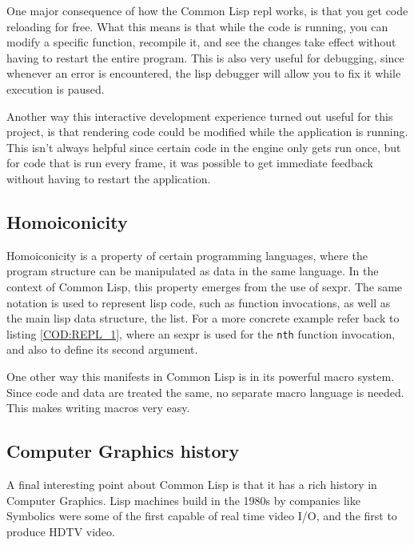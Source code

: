 One major consequence of how the Common Lisp \ac{repl} works,
is that you get code reloading for free.
What this means is that while the code is running,
you can modify a specific function,
recompile it,
and see the changes take effect without having to restart the entire program.
This is also very useful for debugging,
since whenever an error is encountered,
the lisp debugger will allow you to fix it while execution is paused.

Another way this interactive development experience turned out useful for this project,
is that rendering code could be modified while the application is running.
This isn't always helpful since certain code in the engine only gets run once,
but for code that is run every frame,
it was possible to get immediate feedback without having to restart the application.

\subsection{Homoiconicity}

Homoiconicity is a property of certain programming languages,
where the program structure can be manipulated as data in the same language.
In the context of Common Lisp,
this property emerges from the use of \acs{sexpr}.
The same notation is used to represent lisp code,
such as function invocations,
as well as the main lisp data structure,
the list.
For a more concrete example refer back to listing \ref{COD:REPL_1},
where an \ac{sexpr} is used for the \texttt{nth} function invocation,
and also to define its second argument.

One other way this manifests in Common Lisp is in its powerful macro system.
Since code and data are treated the same,
no separate macro language is needed.
This makes writing macros very easy.

\subsection{Computer Graphics history}

A final interesting point about Common Lisp is that it has a rich history in Computer Graphics.
Lisp machines build in the 1980s by companies like Symbolics were some of the first capable of real time video I/O,
and the first to produce HDTV video\cite{symbolics}.
